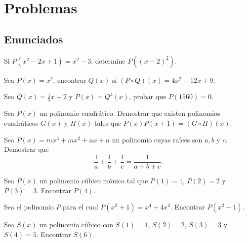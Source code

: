 \newpage
\section{Problemas}

\subsection{Enunciados}

\begin{section-problem}
    Si $P(x^2 - 2x + 1) = x^2 - 3$, determine $P((x - 2)^2).$
\end{section-problem}

\begin{section-problem}
    Sea $P(x) = x^2$, encontrar $Q(x)$ si $(P \circ Q)(x) = 4x^2 - 12x + 9$.
\end{section-problem}

\begin{section-problem}
    Sea $Q(x) = \frac{1}{5} x - 2$ y $P(x) = Q^4(x)$, probar que $P(1560) = 0$.
\end{section-problem}


\begin{section-problem}
    Sea $P(x)$ un polinomio cuadrático.
    Demostrar que existen polinomios cuadráticos $G(x)$ y $H(x)$ tales que $P(x)P(x+1) = (G \circ H)(x).$
\end{section-problem}

\begin{section-problem}
    Sea $P(x) = mx^3 + mx^2 + nx + n$ un polinomio cuyas raíces son $a, b \mbox{ y } c$.
    Demostrar que \[\frac{1}{a} + \frac{1}{b} + \frac{1}{c} = \frac{1}{a + b + c}.\]
\end{section-problem}

\begin{section-problem}
    Sea $P(x)$ un polinomio cúbico mónico tal que $P(1) = 1$, $P(2) = 2$ y $P(3) = 3$.
    Encontrar $P(4).$
\end{section-problem}


\begin{section-problem}
    Sea el polinomio $P$ para el cual $P(x^2 + 1) = x^4 + 4x^2$.
    Encontrar $P(x^2 - 1).$
\end{section-problem}

\begin{section-problem}
    Sea $S(x)$ un polinomio cúbico con $S(1) = 1$, $S(2) = 2$, $S(3) = 3$ y $S(4) = 5$.
    Encontrar $S(6)$.
\end{section-problem}

